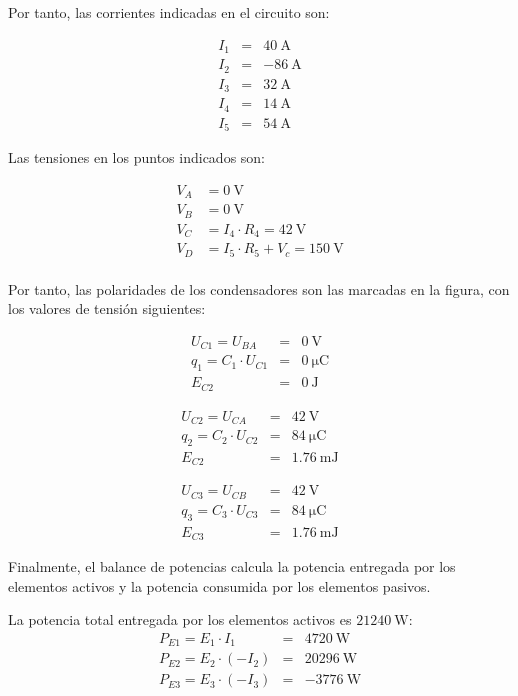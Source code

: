 Por tanto, las corrientes indicadas en el circuito son:

\begin{eqnarray*}
I_1 & = & \qty{40}{\ampere}\\
I_2 & = & \qty{-86}{\ampere}\\
I_3 & = &  \qty{32}{\ampere}\\
I_4 & = &  \qty{14}{\ampere}\\
I_5 & = &  \qty{54}{\ampere}
\end{eqnarray*}

Las tensiones en los puntos indicados son:

\begin{align*}
V_A &= \qty{0}{\volt}\\
V_B &= \qty{0}{\volt}\\
V_C &= I_4 \cdot R_4 = \qty{42}{\volt}\\
V_D &= I_5 \cdot R_5 + V_c = \qty{150}{\volt}\\
\end{align*}

Por tanto, las polaridades de los condensadores son las marcadas en la figura, con los valores de tensión siguientes:

\begin{eqnarray*}
U_{C1} = U_{BA} & = & \qty{0}{\volt}\\
q_1 = C_1 \cdot U_{C1} & = & \qty{0}{\micro\coulomb}\\
E_{C2} & = & \qty{0}{\joule}
\end{eqnarray*}

\begin{eqnarray*}
U_{C2} = U_{CA} & = & \qty{42}{\volt}\\
q_2 = C_2 \cdot U_{C2} & = & \qty{84}{\micro\coulomb}\\
E_{C2} & = & \qty{1.76}{\milli\joule}
\end{eqnarray*}

\begin{eqnarray*}
U_{C3} = U_{CB} & = & \qty{42}{\volt}\\
q_3 = C_3 \cdot U_{C3} & = & \qty{84}{\micro\coulomb}\\
E_{C3} & = & \qty{1.76}{\milli\joule}
\end{eqnarray*}

Finalmente, el balance de potencias calcula la potencia entregada por los elementos activos y la potencia consumida por los elementos pasivos.

La potencia total entregada por los elementos activos es $\qty{21240}{\watt}$:
\begin{eqnarray*}
P_{E1} = E_1 \cdot I_1 & = & \qty{4720}{\watt}\\
P_{E2} = E_2 \cdot (-I_2) & = & \qty{20296}{\watt}\\
P_{E3} = E_3 \cdot (-I_3) & = & \qty{-3776}{\watt}
\end{eqnarray*}

